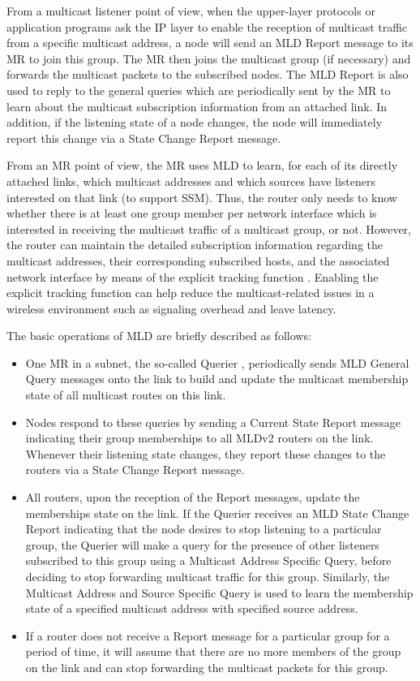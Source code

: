 From a multicast listener point of view, when the upper-layer protocols or application programs ask the IP layer to enable the reception of multicast traffic from a specific multicast address, a node will send an MLD Report message to its MR to join this group. The MR then joins the multicast group (if necessary) and forwards the multicast packets to the subscribed nodes. The MLD Report is also used to reply to the general queries which are periodically sent by the MR to learn about the multicast subscription information from an attached link. In addition, if the listening state of a node changes, the node will immediately report this change via a State Change Report message.

From an MR point of view, the MR uses MLD to learn, for each of its directly attached links, which multicast addresses and which sources have listeners interested on that link (to support SSM). Thus, the router only needs to know whether there is at least one group member per network interface which is interested in receiving the multicast traffic of a multicast group, or not. However, the router can maintain the detailed subscription information regarding the multicast addresses, their corresponding subscribed hosts, and the associated network interface by means of the explicit tracking function \cite{explicit_tracking}. Enabling the explicit tracking function can help reduce the multicast-related issues in a wireless environment such as signaling overhead and leave latency. 

The basic operations of MLD are briefly described as follows:
\begin{itemize}
\item One MR in a subnet, the so-called Querier \cite{MLDv2}, periodically sends MLD General Query messages onto the link to build and update the multicast membership state of all multicast routes on this link. 
\item Nodes respond to these queries by sending a Current State Report message indicating their group memberships to all MLDv2 routers on the link. Whenever their listening state changes, they report these changes to the routers via a State Change Report message. 
\item All routers, upon the reception of the Report messages, update the memberships state on the link. If the Querier receives an MLD State Change Report indicating that the node desires to stop listening to a particular group, the Querier will make a query for the presence of other listeners subscribed to this group using a Multicast Address Specific Query, before deciding to stop forwarding multicast traffic for this group. Similarly, the Multicast Address and Source Specific Query is used to learn the membership state of a specified multicast address with specified source address. 
\item If a router does not receive a Report message for a particular group for a period of time, it will assume that there are no more members of the group on the link and can stop forwarding the multicast packets for this group. 
\end{itemize}

